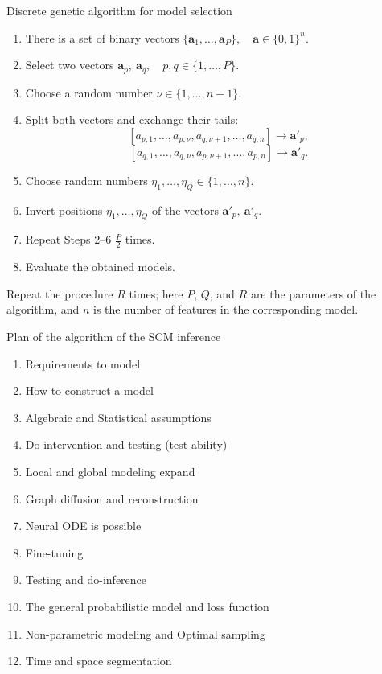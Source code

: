 \documentclass{beamer}
\begin{document}
\begin{frame}{Discrete genetic algorithm for model selection}
\begin{enumerate}
    \item There is a set of binary vectors
    $%
    \{\mathbf{a}_1,\ldots,\mathbf{a}_P\}, \quad \mathbf{a} \in \{0,1\}^{n}.    $%
    \item Select two vectors
    $%
    \mathbf{a}_p,\ \mathbf{a}_q,    \quad    p,q \in \{1,\ldots,P\}.    $%
    \item Choose a random number
    $%
    \nu \in \{1,\ldots,n-1\}.
    $%
    \item Split both vectors and exchange their tails:
    \[
    \left[
    a_{p,1},\ldots,a_{p,\nu},
    a_{q,\nu+1},\ldots,a_{q,n}
    \right]
    \rightarrow
    \mathbf{a}'_{p},
    \]
    \[
    \left[
    a_{q,1},\ldots,a_{q,\nu},
    a_{p,\nu+1},\ldots,a_{p,n}
    \right]
    \rightarrow
    \mathbf{a}'_{q}.
    \]
    \item Choose random numbers    $%
    \eta_1,\ldots,\eta_Q \in \{1,\ldots,n\}.     $%
    \item Invert positions    $%
    \eta_1,\ldots,\eta_Q    $ %
    of the vectors   $%
    \mathbf{a}'_{p},\ \mathbf{a}'_{q}.     $%
    \item Repeat Steps 2--6 $\frac{P}{2} $  times.
    \item Evaluate the obtained models.
\end{enumerate}

\bigskip
Repeat the procedure $R$ times; here $P$, $Q$, and $R$ are the parameters of the algorithm, and $n$ is the number of features in the corresponding model.
\end{frame}
\begin{frame}{Plan of the algorithm of the SCM inference}

\begin{enumerate}
\item Requirements to model
\item How to construct a model
\item Algebraic and Statistical assumptions
\item Do-intervention and testing (test-ability)
\item Local and global modeling expand 
\item Graph diffusion and reconstruction
\item Neural ODE is possible
\item Fine-tuning 
\item Testing and do-inference
\item The general probabilistic model and loss function
\item Non-parametric modeling and Optimal sampling
\item Time and space segmentation
\end{enumerate}
\end{frame}
\end{document}
